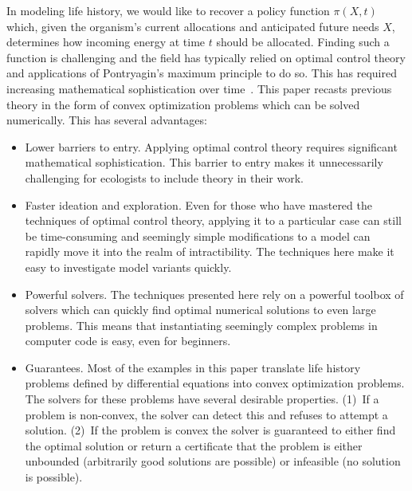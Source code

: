 \documentclass{article}
\begin{document}
In modeling life history, we would like to recover a policy function $\pi(X,t)$ which, given the organism's current allocations and anticipated future needs $X$, determines how incoming energy at time $t$ should be allocated. Finding such a function is challenging and the field has typically relied on optimal control theory and applications of Pontryagin's maximum principle to do so. This has required increasing mathematical sophistication over time~\citep{mirmirani_competition_1978, iwasa_optimal_1989, pugliese_optimal_1990, mironchenko_optimal_2014}. This paper recasts previous theory in the form of convex optimization problems which can be solved numerically. This has several advantages:
\begin{itemize}
\item Lower barriers to entry. Applying optimal control theory requires significant mathematical sophistication. This barrier to entry makes it unnecessarily challenging for ecologists to include theory in their work.
\item Faster ideation and exploration. Even for those who have mastered the techniques of optimal control theory, applying it to a particular case can still be time-consuming and seemingly simple modifications to a model can rapidly move it into the realm of intractibility. The techniques here make it easy to investigate model variants quickly.
\item Powerful solvers. The techniques presented here rely on a powerful toolbox of solvers which can quickly find optimal numerical solutions to even large problems. This means that instantiating seemingly complex problems in computer code is easy, even for beginners.
\item Guarantees. Most of the examples in this paper translate life history problems defined by differential equations into convex optimization problems. The solvers for these problems have several desirable properties. (1)~If a problem is non-convex, the solver can detect this and refuses to attempt a solution. (2)~If the problem is convex the solver is guaranteed to either find the optimal solution or return a certificate that the problem is either unbounded (arbitrarily good solutions are possible) or infeasible (no solution is possible).
\end{itemize}

\end{document}
